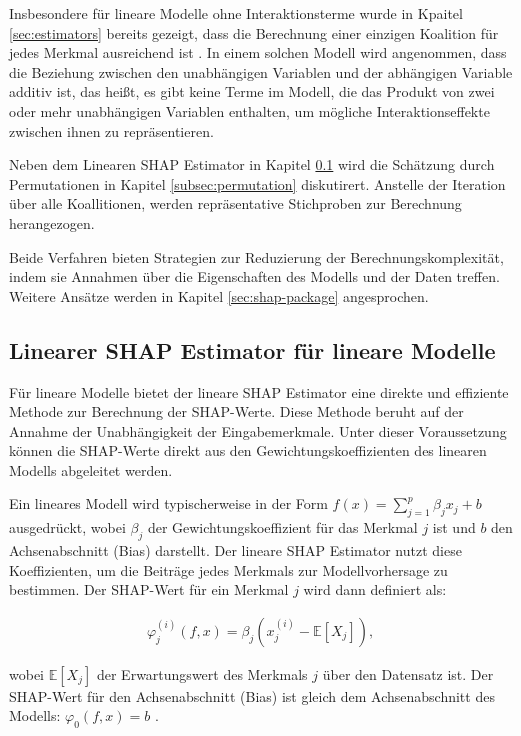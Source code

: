 Insbesondere für lineare Modelle ohne Interaktionsterme wurde in Kpaitel \ref{sec:estimators} bereits gezeigt,
dass die Berechnung einer einzigen Koalition für jedes Merkmal ausreichend ist \cite[S. 38]{Molnar_2023}.
In einem solchen Modell wird angenommen, dass die Beziehung zwischen den unabhängigen 
Variablen und der abhängigen Variable additiv ist, das heißt, es gibt keine Terme im Modell, 
die das Produkt von zwei oder mehr unabhängigen Variablen enthalten, um mögliche Interaktionseffekte 
zwischen ihnen zu repräsentieren.

Neben dem Linearen SHAP Estimator in Kapitel \ref{subsec:linear-shap-estimator} wird die Schätzung durch Permutationen in Kapitel 
\ref{subsec:permutation} diskutirert. Anstelle der Iteration über alle Koallitionen, werden repräsentative Stichproben zur Berechnung
herangezogen. 

Beide Verfahren bieten Strategien zur Reduzierung der Berechnungskomplexität, 
indem sie Annahmen über die Eigenschaften des Modells und der Daten treffen. 
Weitere Ansätze werden in Kapitel \ref{sec:shap-package} angesprochen.


\subsection{Linearer SHAP Estimator für lineare Modelle}
\label{subsec:linear-shap-estimator}

Für lineare Modelle bietet der lineare SHAP Estimator eine direkte und effiziente 
Methode zur Berechnung der SHAP-Werte. Diese Methode beruht auf der Annahme 
der Unabhängigkeit der Eingabemerkmale. Unter dieser Voraussetzung können 
die SHAP-Werte direkt aus den Gewichtungskoeffizienten des linearen Modells 
abgeleitet werden.

Ein lineares Modell wird typischerweise in der Form 
\( f(x) = \sum_{j=1}^{p} \beta_j x_j + b \) ausgedrückt, wobei \( \beta_j \) der 
Gewichtungskoeffizient für das Merkmal \( j \) ist und \( b \) den 
Achsenabschnitt (Bias) darstellt. Der lineare SHAP Estimator nutzt 
diese Koeffizienten, um die Beiträge jedes Merkmals zur Modellvorhersage 
zu bestimmen. Der SHAP-Wert für ein Merkmal \( j \) wird dann definiert als:

\begin{align}
    \varphi_j^{(i)}(f, x) = \beta_j (x_j^{(i)} - \mathbb{E}[X_j]),
\end{align}

wobei \( \mathbb{E}[X_j] \) der Erwartungswert des Merkmals \( j \) über den 
Datensatz ist. Der SHAP-Wert für den Achsenabschnitt (Bias) ist gleich 
dem Achsenabschnitt des Modells: \( \varphi_0(f, x) = b \) \cite[S. 6]{NIPS2017_8a20a862}.

